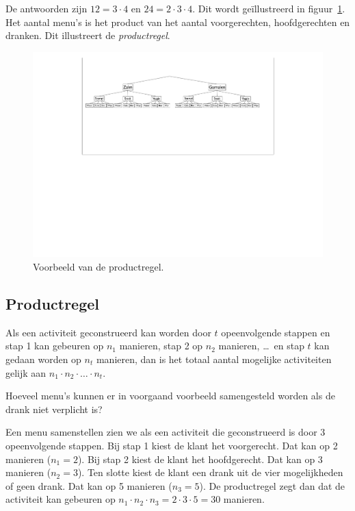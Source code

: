 De antwoorden zijn $12=3\cdot 4$ en $24=2\cdot 3\cdot 4$. Dit wordt geïllustreerd in figuur~\ref{fig:hamburgers}.  Het aantal menu's is het product van het aantal voorgerechten, hoofdgerechten en dranken. Dit illustreert de \emph{productregel}.

\begin{figure}[htbp]
\begin{center}
\includegraphics[width=\textwidth]{figuren/telproblemen/04hamburgers}
\caption{Voorbeeld van de productregel.}
\label{fig:hamburgers}
\end{center}
\end{figure}


\subsection{Productregel}
Als een activiteit geconstrueerd kan worden door $t$ opeenvolgende stappen en stap 1 kan gebeuren op $n_1$ manieren, stap 2 op $n_2$ manieren, \dots\ en stap $t$ kan gedaan worden op $n_t$ manieren, dan is het totaal aantal mogelijke activiteiten gelijk aan $n_1\cdot n_2\cdot \dots\cdot n_t$.

\voorbeeld
Hoeveel menu's kunnen er in voorgaand voorbeeld samengesteld worden als de drank niet verplicht is?

Een menu samenstellen zien we als een activiteit die geconstrueerd is door 3 opeenvolgende stappen. Bij stap 1 kiest de klant het voorgerecht. Dat kan op 2 manieren ($n_1=2$). Bij stap 2 kiest de klant het hoofdgerecht. Dat kan op 3 manieren ($n_2=3$). Ten slotte kiest de klant een drank uit de vier mogelijkheden of geen drank. Dat kan op 5 manieren ($n_3=5$). De productregel zegt dan dat de activiteit kan gebeuren op $n_1\cdot n_2\cdot n_3=2\cdot3\cdot5=30$ manieren.

